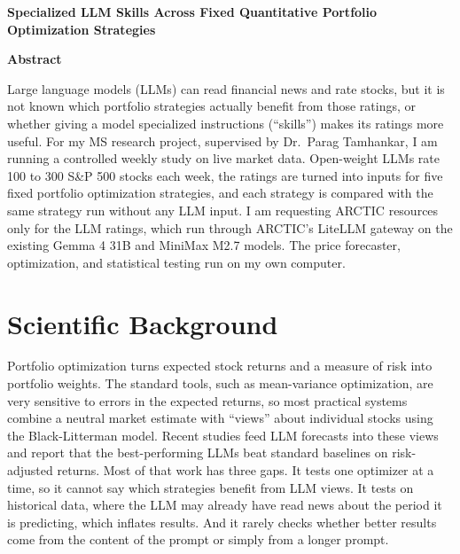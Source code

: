 \documentclass[11pt,letterpaper]{article}
\begin{document}
\begin{center}
{\bfseries Specialized LLM Skills Across Fixed Quantitative Portfolio Optimization Strategies}
\end{center}

\textbf{Abstract}

Large language models (LLMs) can read financial news and rate stocks, but it is not known which portfolio strategies actually benefit from those ratings, or whether giving a model specialized instructions (``skills'') makes its ratings more useful. For my MS research project, supervised by Dr.\ Parag Tamhankar, I am running a controlled weekly study on live market data. Open-weight LLMs rate 100 to 300 S\&P 500 stocks each week, the ratings are turned into inputs for five fixed portfolio optimization strategies, and each strategy is compared with the same strategy run without any LLM input. I am requesting ARCTIC resources only for the LLM ratings, which run through ARCTIC's LiteLLM gateway on the existing Gemma 4 31B and MiniMax M2.7 models. The price forecaster, optimization, and statistical testing run on my own computer.

\section{Scientific Background}
Portfolio optimization turns expected stock returns and a measure of risk into portfolio weights. The standard tools, such as mean-variance optimization, are very sensitive to errors in the expected returns, so most practical systems combine a neutral market estimate with ``views'' about individual stocks using the Black-Litterman model. Recent studies feed LLM forecasts into these views and report that the best-performing LLMs beat standard baselines on risk-adjusted returns. Most of that work has three gaps. It tests one optimizer at a time, so it cannot say which strategies benefit from LLM views. It tests on historical data, where the LLM may already have read news about the period it is predicting, which inflates results. And it rarely checks whether better results come from the content of the prompt or simply from a longer prompt.
\end{document}
